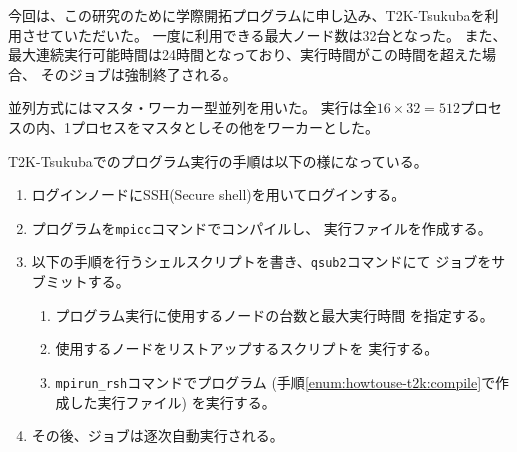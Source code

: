 今回は、この研究のために学際開拓プログラムに申し込み、T2K-Tsukubaを利用させていただいた。
一度に利用できる最大ノード数は32台となった。
また、最大連続実行可能時間は24時間となっており、実行時間がこの時間を超えた場合、
そのジョブは強制終了される。

並列方式にはマスタ・ワーカー型並列を用いた。
実行は全$16 \times 32 = 512$プロセスの内、1プロセスをマスタとしその他をワーカーとした。

T2K-Tsukubaでのプログラム実行の手順は以下の様になっている。
\begin{enumerate}
	\item ログインノードにSSH(Secure shell)を用いてログインする。
	\item プログラムを{\tt mpicc}コマンドでコンパイルし、
	実行ファイルを作成する。 \label{enum:howtouse-t2k:compile}
	\item 以下の手順を行うシェルスクリプトを書き、{\tt qsub2}コマンドにて
 	ジョブをサブミットする。
  	\begin{enumerate}
   		\item プログラム実行に使用するノードの台数と最大実行時間
     		を指定する。
   		\item 使用するノードをリストアップするスクリプトを
     		実行する。
       		\item {\tt mpirun\_rsh}コマンドでプログラム
         	(手順\ref{enum:howtouse-t2k:compile}で作成した実行ファイル)
          	を実行する。
   	\end{enumerate}
    	\item その後、ジョブは逐次自動実行される。
\end{enumerate}
